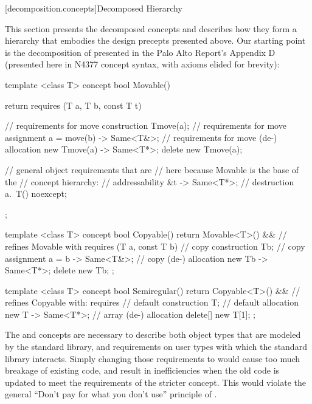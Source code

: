 [decomposition.concepts]{Decomposed Hierarchy}

\pnum
This section presents the decomposed concepts and describes how they form a hierarchy that
embodies the design precepts presented above. Our starting point is the decomposition of
 presented in the Palo Alto Report's Appendix D (presented here in N4377
concept syntax, with axioms elided for brevity):

\begin{codeblock}
template <class T>
concept bool Movable() {
  return requires (T a, T b, const T t) {
    // requirements for move construction
    T{move(a)};
    // requirements for move assignment
    { a = move(b) } -> Same<T&>;
    // requirements for move (de-) allocation
    { new T{move(a)} } -> Same<T*>;
    delete new T{move(a)};

    // general object requirements that are
    // here because Movable is the base of the
    // concept hierarchy:
    // addressability
    { &t } -> Same<T*>;
    // destruction
    { a.~T() } noexcept;
  };
}

template <class T>
concept bool Copyable() {
  return Movable<T>() && // refines Movable with
    requires (T a, const T b) {
      // copy construction
      T{b};
      // copy assignment
      { a = b } -> Same<T&>;
      // copy (de-) allocation
      { new T{b} } -> Same<T*>;
      delete new T{b};
    };
}

template <class T>
concept bool Semiregular() {
  return Copyable<T>() && // refines Copyable with:
    requires {
      // default construction
      T{};
      // default allocation
      { new T{} } -> Same<T*>;
      // array (de-) allocation
      delete[] new T[1];
    };
}
\end{codeblock}
The  and  concepts are necessary to describe both object types
that are modeled by the standard library, and requirements on user types with which the standard
library interacts. Simply changing those requirements to  would cause too
much breakage of existing code, and result in inefficiencies when the old code is updated to meet
the requirements of the stricter concept. This would violate the general ``Don't pay for what you
don't use'' principle of \Cpp.


